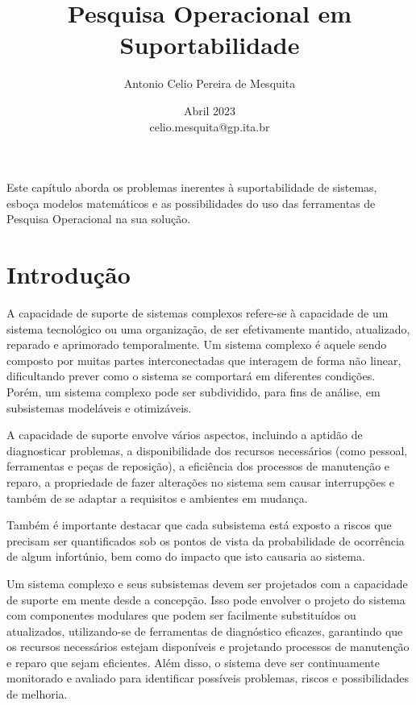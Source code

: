 \documentclass{amsart}
\begin{document}
		
	\title{Pesquisa Operacional em Suportabilidade}
	\author{Antonio Celio Pereira de Mesquita}
	\date{ Abril 2023 \\ celio.mesquita@gp.ita.br}
	

\maketitle


	Este capítulo aborda os problemas inerentes à suportabilidade de sistemas, esboça modelos matemáticos e as possibilidades do uso das ferramentas de Pesquisa Operacional na sua solução.
	

\section{Introdução}

A capacidade de suporte de sistemas complexos refere-se à capacidade de um sistema tecnológico ou uma organização, de ser efetivamente mantido, atualizado, reparado e aprimorado temporalmente. Um sistema complexo é aquele sendo composto por muitas partes interconectadas que interagem de forma não linear, dificultando prever como o sistema se comportará em diferentes condições. Porém, um sistema complexo pode ser subdividido, para fins de análise, em subsistemas modeláveis e otimizáveis.

A capacidade de suporte envolve vários aspectos, incluindo a aptidão de diagnosticar problemas, a disponibilidade dos recursos necessários (como pessoal, ferramentas e peças de reposição), a eficiência dos processos de manutenção e reparo, a propriedade de fazer alterações no sistema sem causar interrupções e também de se adaptar a requisitos e ambientes em mudança.

Também é importante destacar que cada subsistema está exposto a riscos que precisam ser quantificados sob os pontos de vista da probabilidade de ocorrência de algum infortúnio, bem como do impacto que isto causaria ao sistema.

Um sistema complexo e seus subsistemas devem ser projetados com a capacidade de suporte em mente desde a concepção. Isso pode envolver o projeto do sistema com componentes modulares que podem ser facilmente substituídos ou atualizados, utilizando-se de ferramentas de diagnóstico eficazes, garantindo que os recursos necessários estejam disponíveis e projetando processos de manutenção e reparo que sejam eficientes. Além disso, o sistema deve ser continuamente monitorado e avaliado para identificar possíveis problemas, riscos e possibilidades de melhoria.
\end{document}
